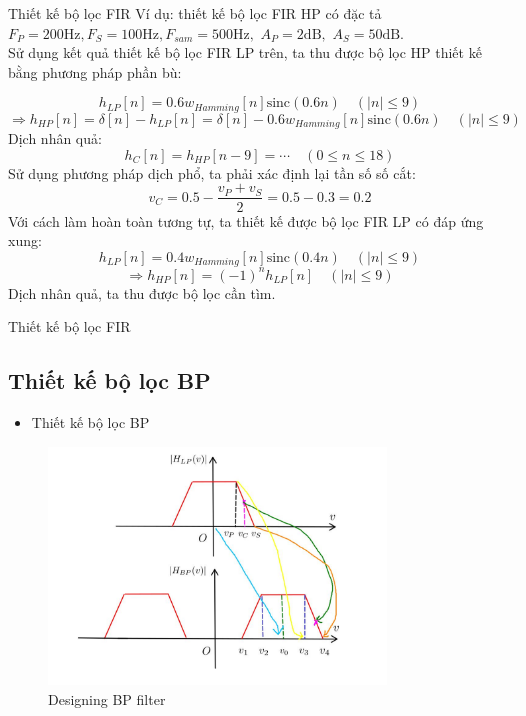 \documentclass[8pt]{beamer}
\begin{document}
\begin{frame}{Thiết kế bộ lọc FIR}
	Ví dụ: thiết kế bộ lọc FIR HP có đặc tả $F_{P}=200\text{Hz},F_{S}=100\text{Hz},F_{sam}=500\text{Hz},$ $A_{P}=2\text{dB},$ $A_{S}=50\text{dB}.$
	\\Sử dụng kết quả thiết kế bộ lọc FIR LP trên, ta thu được bộ lọc HP thiết kế bằng phương pháp phần bù:

	$$h_{LP}[n]=0.6w_{Hamming}[n]\text{sinc}(0.6n)\quad\left(|n|\leq 9\right)$$
	$$\Rightarrow h_{HP}[n]=\delta[n]-h_{LP}[n]=\delta[n]-0.6w_{Hamming}[n]\text{sinc}(0.6n)\quad\left(|n|\leq 9\right)$$
	Dịch nhân quả:
	$$h_{C}[n]=h_{HP}[n-9]=\cdots\quad(0\leq n\leq18)$$
	Sử dụng phương pháp dịch phổ, ta phải xác định lại tần số số cắt:
	$$v_{C}=0.5-\frac{v_{P}+v_{S}}{2}=0.5-0.3=0.2$$
	Với cách làm hoàn toàn tương tự, ta thiết kế được bộ lọc FIR LP có đáp ứng xung:
	$$h_{LP}[n]=0.4w_{Hamming}[n]\text{sinc}(0.4n)\quad\left(|n|\leq 9\right)$$
	$$\Rightarrow h_{HP}[n]=(-1)^{n}h_{LP}[n]\quad\left(|n|\leq 9\right)$$
	Dịch nhân quả, ta thu được bộ lọc cần tìm.
\end{frame}
\begin{frame}{Thiết kế bộ lọc FIR}
	\subsection{Thiết kế bộ lọc BP}
	\begin{itemize}
		\item Thiết kế bộ lọc BP
	\end{itemize}
	\begin{figure}[h]
		\includegraphics[width=0.8\textwidth]{11.jpg}
		\caption{Designing BP filter}			\label{fig:re12}
	\end{figure}
\end{frame}
\end{document}

